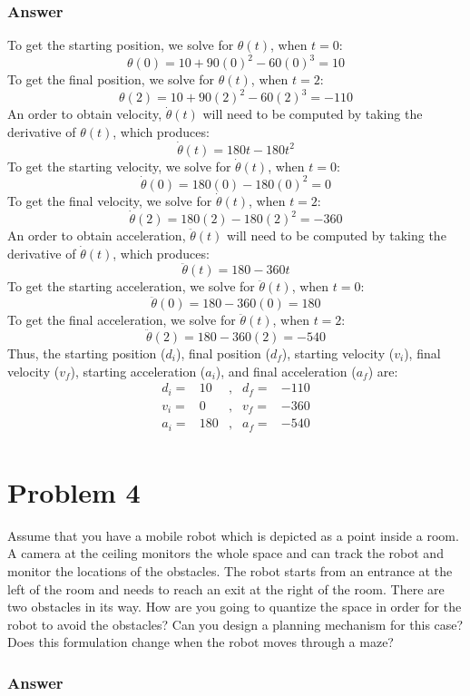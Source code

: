 \documentclass[10pt]{article}
\begin{document}
\subsubsection*{Answer}
To get the starting position, we solve for \(\theta(t)\), when \(t = 0\):
\[\theta(0) = 10 + 90(0)^2 - 60(0)^3 = 10\]
To get the final position, we solve for \(\theta(t)\), when \(t = 2\):
\[\theta(2) = 10 + 90(2)^2 - 60(2)^3 = -110\]
An order to obtain velocity, \(\dot{\theta}(t)\) will need to be computed by taking the derivative of \(\theta(t)\), which produces:
\[\dot{\theta}(t) = 180t - 180t^2\]
To get the starting velocity, we solve for \(\dot{\theta}(t)\), when \(t = 0\):
\[\dot{\theta}(0) = 180(0) - 180(0)^2 = 0\]
To get the final velocity, we solve for \(\dot{\theta}(t)\), when \(t = 2\):
\[\dot{\theta}(2) = 180(2) - 180(2)^2 = -360\]
An order to obtain acceleration, \(\ddot{\theta}(t)\) will need to be computed by taking the derivative of \(\dot{\theta}(t)\), which produces:
\[\ddot{\theta}(t) = 180 - 360t\]
To get the starting acceleration, we solve for \(\ddot{\theta}(t)\), when \(t = 0\):
\[\ddot{\theta}(0) = 180 - 360(0) = 180\]
To get the final acceleration, we solve for \(\ddot{\theta}(t)\), when \(t = 2\):
\[\ddot{\theta}(2) = 180 - 360(2) = -540\]
Thus, the starting position (\(d_i\)), final position (\(d_f\)), starting velocity (\(v_i\)), final velocity (\(v_f\)), starting acceleration (\(a_i\)), and final acceleration (\(a_f\)) are:
\[
\begin{array}{lrllr}
    d_i = &10 &,& d_f = &-110  \\
    v_i = &0  &,& v_f = &-360  \\
    a_i = &180 &,& a_f = &-540 \\
\end{array}
\]
\pagebreak
\section*{Problem 4} %
Assume that you have a mobile robot which is depicted as a point inside a room. A camera at the ceiling monitors the whole space and can track the robot and monitor the locations of the obstacles. The robot starts from an entrance at the left of the room and needs to reach an exit at the right of the room. There are two obstacles in its way. How are you going to quantize the space in order for the robot to avoid the obstacles? Can you design a planning mechanism for this case? Does this formulation change when the robot moves through a maze?
\subsubsection*{Answer}
\end{document}
